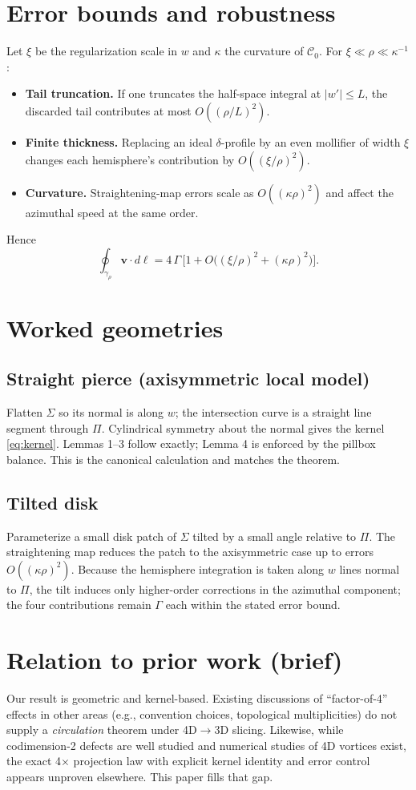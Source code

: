 \documentclass[11pt]{article}
\begin{document}
\section{Error bounds and robustness}\label{sec:errors}
Let $\xi$ be the regularization scale in $w$ and $\kappa$ the curvature of $\mathcal C_0$. For $\xi\ll\rho\ll \kappa^{-1}$:
\begin{itemize}
  \item \textbf{Tail truncation.} If one truncates the half-space integral at $|w'|\le L$, the discarded tail contributes at most $O((\rho/L)^2)$.
  \item \textbf{Finite thickness.} Replacing an ideal $\delta$-profile by an even mollifier of width $\xi$ changes each hemisphere’s contribution by $O((\xi/\rho)^2)$.
  \item \textbf{Curvature.} Straightening-map errors scale as $O((\kappa\rho)^2)$ and affect the azimuthal speed at the same order.
\end{itemize}
Hence
\[
\oint_{\gamma_\rho}\bm v\cdot d\bm\ell=4\,\Gamma\,\Big[1+O\!\big((\xi/\rho)^2+(\kappa\rho)^2\big)\Big].
\]

\section{Worked geometries}
\subsection{Straight pierce (axisymmetric local model)}
Flatten $\Sigma$ so its normal is along $w$; the intersection curve is a straight line segment through $\Pi$. Cylindrical symmetry about the normal gives the kernel \eqref{eq:kernel}. Lemmas 1–3 follow exactly; Lemma 4 is enforced by the pillbox balance. This is the canonical calculation and matches the theorem.

\subsection{Tilted disk}
Parameterize a small disk patch of $\Sigma$ tilted by a small angle relative to $\Pi$. The straightening map reduces the patch to the axisymmetric case up to errors $O((\kappa\rho)^2)$. Because the hemisphere integration is taken along $w$ lines normal to $\Pi$, the tilt induces only higher-order corrections in the azimuthal component; the four contributions remain $\Gamma$ each within the stated error bound.

\section{Relation to prior work (brief)}
Our result is geometric and kernel-based. Existing discussions of ``factor-of-4'' effects in other areas (e.g., convention choices, topological multiplicities) do not supply a \emph{circulation} theorem under 4D$\to$3D slicing. Likewise, while codimension-2 defects are well studied and numerical studies of 4D vortices exist, the exact 4$\times$ projection law with explicit kernel identity and error control appears unproven elsewhere. This paper fills that gap.
\end{document}
